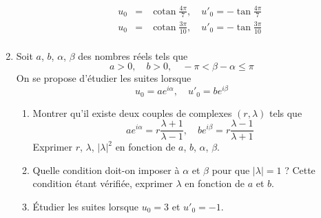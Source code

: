 \begin{enumerate}
\begin{enumerate}
\begin{eqnarray*}
  u_0 &=& \mathop{\mathrm{cotan}}\frac{4\pi}{7},\quad u'_0=-\tan
  \frac{4\pi}{7}\\
  u_0 &=& \mathop{\mathrm{cotan}}\frac{3\pi}{10},\quad u'_0=-\tan
  \frac{3\pi}{10}\\
  \end{eqnarray*}
\end{enumerate}
\item Soit $a$, $b$, $\alpha$, $\beta$ des nombres r{\'e}els tels que
\[a>0,\quad b>0,\quad -\pi<\beta-\alpha \leq \pi\]
On se propose d'{\'e}tudier les suites lorsque
\[u_0=ae^{i\alpha},\quad u'_0=be^{i\beta}\]
\begin{enumerate}
  \item Montrer qu'il existe deux couples de complexes
  $(r,\lambda)$ tels que
\[ae^{i\alpha}=r\frac{\lambda+1}{\lambda-1},\quad be^{i\beta}=r\frac{\lambda-1}{\lambda+1}\]
Exprimer $r$, $\lambda$, $|\lambda|^2$ en fonction de $a$, $b$,
$\alpha$, $\beta$.
  \item Quelle condition doit-on imposer {\`a} $\alpha$ et $\beta$
  pour que $|\lambda|=1$ ? Cette condition {\'e}tant v{\'e}rifi{\'e}e,
  exprimer $\lambda$ en fonction de $a$ et $b$.
  \item {\'E}tudier les suites lorsque $u_0=3$ et $u'_0=-1$.
\end{enumerate}

\end{enumerate}
